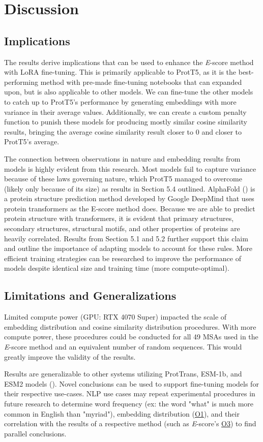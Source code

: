 \chapter{Discussion}

\section{Implications}
The results derive implications that can be used to enhance the \textit{E}-score method with \gls{LoRA} fine-tuning. This is primarily applicable to ProtT5, as it is the best-performing method with pre-made fine-tuning notebooks that can expanded upon, but is also applicable to other models. We can fine-tune the other models to catch up to ProtT5's performance by generating embeddings with more variance in their average values. Additionally, we can create a custom penalty function to punish these models for producing mostly similar cosine similarity results, bringing the average cosine similarity result closer to 0 and closer to ProtT5's average.

The connection between observations in nature and embedding results from models is highly evident from this research. Most models fail to capture variance because of these laws governing nature, which ProtT5 managed to overcome (likely only because of its size) as results in Section 5.4 outlined. AlphaFold (\cite{Jumper:2021}) is a protein structure prediction method developed by Google DeepMind that uses protein transformers as the E-score method does. Because we are able to predict protein structure with transformers, it is evident that primary structures, secondary structures, structural motifs, and other properties of proteins are heavily correlated. Results from Section 5.1 and 5.2 further support this claim and outline the importance of adapting models to account for these rules. More efficient training strategies can be researched to improve the performance of models despite identical size and training time (more compute-optimal).

\section{Limitations and Generalizations}
Limited compute power (GPU: RTX 4070 Super) impacted the scale of embedding distribution and cosine similarity distribution procedures. With more compute power, these procedures could be conducted for all 49 \glspl{MSA} used in the \textit{E}-score method and an equivalent number of random sequences. This would greatly improve the validity of the results.

Results are generalizable to other systems utilizing ProtTrans, ESM-1b, and ESM2 models (\cite{Elnaggar:2021, Rives:2021}). Novel conclusions can be used to support fine-tuning models for their respective use-cases. \gls{NLP} use cases may repeat experimental procedures in future research to determine word frequency (ex: the word "what" is much more common in English than "myriad"), embedding distribution (\hyperlink{O1}{O1}), and their correlation with the results of a respective method (such as \textit{E}-score's \hyperlink{O3}{O3}) to find parallel conclusions.
